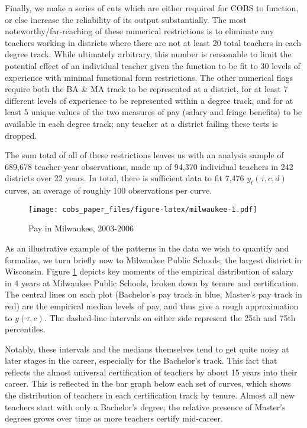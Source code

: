 \documentclass[]{article}
\begin{document}
Finally, we make a series of cuts which are either required for COBS to
function, or else increase the reliability of its output substantially.
The most noteworthy/far-reaching of these numerical restrictions is to
eliminate any teachers working in districts where there are not at least
20 total teachers in each degree track. While ultimately arbitrary, this
number is reasonable to limit the potential effect of an individual
teacher given the function to be fit to 30 levels of experience with
minimal functional form restrictions. The other numerical flags require
both the BA \& MA track to be represented at a district, for at least 7
different levels of experience to be represented within a degree track,
and for at least 5 unique values of the two measures of pay (salary and
fringe benefits) to be available in each degree track; any teacher at a
district failing these tests is dropped.

The sum total of all of these restrictions leaves us with an analysis
sample of 689,678 teacher-year observations, made up of 94,370
individual teachers in 242 districts over 22 years. In total, there is
sufficient data to fit 7,476 \(y_t(\tau, c, d)\) curves, an average of
roughly 100 observations per curve.

\begin{figure}[htbp]
\centering
\texttt{[image: cobs\_paper\_files/figure-latex/milwaukee-1.pdf]}
\caption{\label{fig:mwk}Pay in Milwaukee, 2003-2006}
\end{figure}

As an illustrative example of the patterns in the data we wish to
quantify and formalize, we turn briefly now to Milwaukee Public Schools,
the largest district in Wisconsin. Figure \ref{fig:mwk} depicts key
moments of the empirical distribution of salary in 4 years at Milwaukee
Public Schools, broken down by tenure and certification. The central
lines on each plot (Bachelor's pay track in blue, Master's pay track in
red) are the empirical median levels of pay, and thus give a rough
approximation to \(y(\tau, c)\). The dashed-line intervals on either
side represent the 25th and 75th percentiles.

Notably, these intervals and the medians themselves tend to get quite
noisy at later stages in the career, especially for the Bachelor's
track. This fact that reflects the almost universal certification of
teachers by about 15 years into their career. This is reflected in the
bar graph below each set of curves, which shows the distribution of
teachers in each certification track by tenure. Almost all new teachers
start with only a Bachelor's degree; the relative presence of Master's
degrees grows over time as more teachers certify mid-career.
\end{document}
